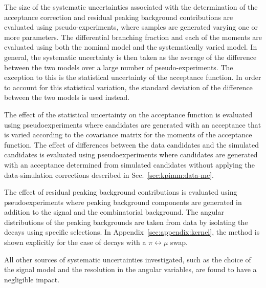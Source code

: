 The size of the systematic uncertainties associated with the determination of the acceptance correction and residual peaking background contributions are evaluated using pseudo-experiments, where samples are generated varying one or more parameters.  The differential branching fraction and each of the moments are evaluated using both the nominal model and the systematically varied model. 
In general, the systematic uncertainty is then taken as the average of the difference between the two models over a large number of pseudo-experiments. The exception to this is the statistical uncertainty of the acceptance function. In order to account for this statistical variation, the standard deviation of the difference between the two models is used instead.

The effect of the statistical uncertainty on the acceptance function is evaluated using pseudoexperiments where candidates are generated with an acceptance that is varied according to the covariance matrix for the moments of the acceptance function. The effect of differences between the data candidates and the simulated candidates is evaluated using pseudoexperiments where candidates are generated with an acceptance determined from simulated candidates without applying the data-simulation corrections described in Sec.~\ref{sec:kpimm:data-mc}.

The effect of residual peaking background contributions is evaluated using pseudoexperiments where peaking background components are generated in addition to the signal and the combinatorial background.  The angular distributions of the peaking backgrounds are taken from data by isolating the decays using specific selections. In Appendix~\ref{sec:appendix:kernel}, the method is shown explicitly for the case of \BdToJPsiKpi decays with a $\pi\leftrightarrow\mu$ swap.

All other sources of systematic uncertainties investigated, such as the choice of the \mkpimm signal model and the resolution in the angular variables, are found to have a negligible impact.
